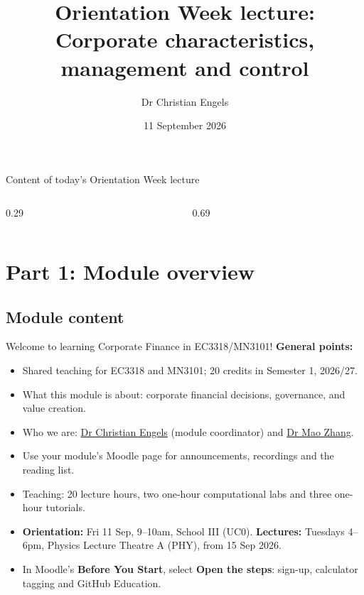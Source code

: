 \documentclass[9pt,aspectratio=169]{beamer}
\title{\LARGE Orientation Week lecture: \\
Corporate characteristics, management and control }
\author[Dr Christian Engels \& Dr Mao Zhang]{Dr Christian Engels}
\institute{\small{EC3318 Financial Economics: Corporate Finance \\ MN3101 Corporate Finance and Control \\[2mm] University of St Andrews Business School}}
\date{11 September 2026}
\begin{document}
\frame[plain]{\titlepage}


\begin{frame}{Content of today's Orientation Week lecture}
\begin{columns}[t]
  \begin{column}{0.29\textwidth}
    \tableofcontents[sections={1}]
  \end{column}
  \begin{column}{0.69\textwidth}
    \tableofcontents[sections={2}]
  \end{column}
\end{columns}
\end{frame}

\section[Part 1. Module overview]{\textbf{Part 1: Module overview}}

\subsection{Module content}

\begin{frame}{Welcome to learning Corporate Finance in EC3318/MN3101!}
\textbf{General points:}
\begin{itemize}
\item Shared teaching for EC3318 and MN3101; 20 credits in Semester 1, 2026/27.
  \item What this module is about: corporate financial decisions, governance, and value creation.  
  \item Who we are: \href{https://www.st-andrews.ac.uk/business-school/people/finance/ce50/}{Dr Christian Engels} (module coordinator) and \href{https://www.st-andrews.ac.uk/business-school/people/finance/mz71/}{Dr Mao Zhang}.
  \item Use your module's Moodle page for announcements, recordings and the reading list.
  \item Teaching: 20 lecture hours, two one-hour computational labs and three one-hour tutorials.
  \item \textbf{Orientation:} Fri 11 Sep, 9--10am, School III (UC0). \textbf{Lectures:} Tuesdays 4--6pm, Physics Lecture Theatre A (PHY), from 15 Sep 2026.
  \item In Moodle's \textbf{Before You Start}, select \textbf{Open the steps}: sign-up, calculator tagging and GitHub Education.
\end{itemize}
\end{frame}
\end{document}
